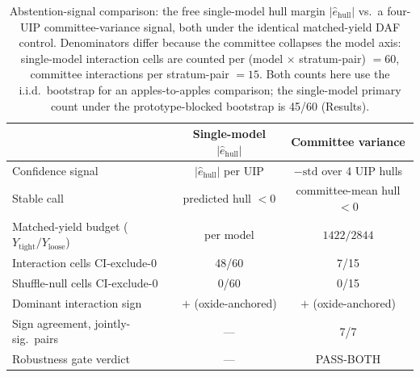 \documentclass[aip,jcp,preprint,superscriptaddress,amsmath,amssymb]{revtex4-2}
\begin{document}
\begin{table}[t]
  \centering
  \caption{Abstention-signal comparison: the free single-model hull margin
  $|\hat{e}_{\mathrm{hull}}|$ vs.\ a four-UIP committee-variance signal, both under the
  identical matched-yield DAF control. Denominators differ because the committee collapses
  the model axis: single-model interaction cells are counted per (model $\times$
  stratum-pair) $=60$, committee interactions per stratum-pair $=15$. Both counts here use
  the i.i.d.\ bootstrap for an apples-to-apples comparison; the single-model primary count
  under the prototype-blocked bootstrap is 45/60 (Results).}
  \label{tab:signalcompare}
  \begin{tabular}{lcc}
    \toprule
    & Single-model $|\hat{e}_{\mathrm{hull}}|$ & Committee variance \\
    \midrule
    Confidence signal              & $|\hat{e}_{\mathrm{hull}}|$ per UIP & $-\mathrm{std}$ over 4 UIP hulls \\
    Stable call                    & predicted hull $<0$                & committee-mean hull $<0$ \\
    Matched-yield budget ($Y_{\mathrm{tight}}/Y_{\mathrm{loose}}$) & per model & $1422 / 2844$ \\
    Interaction cells CI-exclude-0 & 48/60                              & 7/15 \\
    Shuffle-null cells CI-exclude-0 & 0/60                              & 0/15 \\
    Dominant interaction sign      & $+$ (oxide-anchored)               & $+$ (oxide-anchored) \\
    Sign agreement, jointly-sig.\ pairs & ---                           & 7/7 \\
    Robustness gate verdict        & ---                                & PASS-BOTH \\
    \bottomrule
  \end{tabular}
\end{table}
\end{document}
